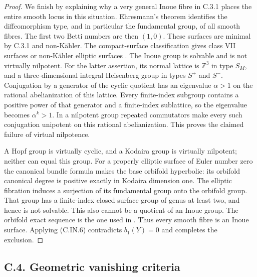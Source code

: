 \begin{proof}
We finish by explaining why a very general Inoue fibre in C.3.1
places the entire smooth locus in this situation. Ehresmann's
theorem identifies the diffeomorphism type, and in particular
the fundamental group, of all smooth fibres. The first two
Betti numbers are then $(1,0)$. These surfaces are minimal by
C.3.1 and non-K\"ahler. The compact-surface classification
gives class VII surfaces or non-K\"ahler elliptic surfaces
\cite[Theorem 3.2]{BMS2012}.
The Inoue group is solvable and is not virtually nilpotent.
For the latter assertion, its normal lattice is $\mathbb Z^3$
in type $S_M$, and a three-dimensional integral Heisenberg group
in types $S^{+}$ and $S^{-}$. Conjugation by a generator of the
cyclic quotient has an eigenvalue $\alpha>1$ on the rational
abelianization of this lattice. Every finite-index subgroup
contains a positive power of that generator and a finite-index
sublattice, so the eigenvalue becomes $\alpha^k>1$. In a
nilpotent group repeated commutators make every such conjugation
unipotent on this rational abelianization. This proves the
claimed failure of virtual nilpotence.

A Hopf group is virtually cyclic, and a Kodaira group is virtually
nilpotent; neither can equal this group. For a properly elliptic
surface of Euler number zero the canonical bundle formula makes
the base orbifold hyperbolic: its orbifold canonical degree is
positive exactly in Kodaira dimension one. The elliptic
fibration induces a surjection of its fundamental group onto the
orbifold group. That group has a finite-index closed surface
group of genus at least two, and hence is not solvable. This
also cannot be a quotient of an Inoue group. The orbifold exact
sequence is the one used in \cite[Section 3.3]{BMS2012}.
Thus every smooth fibre is an Inoue surface. Applying (C.IN.6)
contradicts $b_1(Y)=0$ and completes the exclusion.
\end{proof}


\subsection{C.4. Geometric vanishing criteria}


